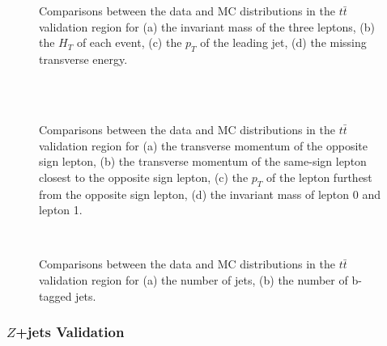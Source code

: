 \begin{figure}[h]
    \\
    \\
    \caption{Comparisons between the data and MC distributions in the $t\bar{t}$ validation region for (a) the invariant mass of the three leptons, (b) the $H_T$ of each event, (c) the $p_T$ of the leading jet, (d) the missing transverse energy.}    
    \end{figure}
\begin{figure}[h]
    \\
    \\
    \caption{Comparisons between the data and MC distributions in the $t\bar{t}$ validation region for (a) the transverse momentum of the opposite sign lepton, (b) the transverse momentum of the same-sign lepton closest to the opposite sign lepton, (c) the $p_T$ of the lepton furthest from the opposite sign lepton, (d) the invariant mass of lepton 0 and lepton 1.}
\end{figure}
\begin{figure}[h]
    \\
    \caption{Comparisons between the data and MC distributions in the $t\bar{t}$ validation region for (a) the number of jets, (b) the number of b-tagged jets.}
    \label{ttbar_kinematics}
\end{figure}

\subsubsection{$Z$+jets Validation}

